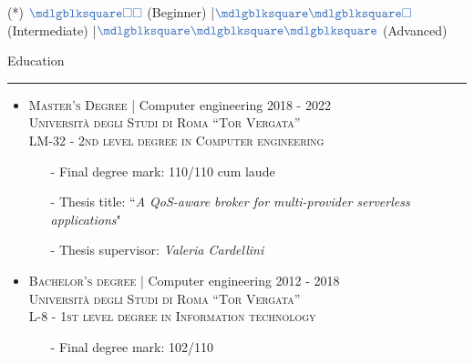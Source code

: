 \documentclass[english,10pt,a4paper]{article}
\newcommand{\CompanyName}[1]{\textsc{{\small #1}}}
\newcommand{\JobTimeRange}[1]{{\scriptsize \textcolor{CvColor!50}{\faCalendar*} \hspace{0.01cm} \textcolor{CvIcon}{#1}}}
\newcommand{\CvSection}[2]{
	\hspace{0.25cm}\textcolor{CvColor!50}{#1} \hspace{0.01cm} \textcolor{CvColor!80}{#2}\\
	\textcolor{CvColor}{\rule[.7\baselineskip]{\textwidth}{1pt}}}
\newcommand{\CvSidebarSection}[2]{
	\textcolor{CvColor!50}{{\footnotesize #1}} \hspace{0.01cm} \textcolor{CvColor!80}{{\footnotesize #2}} \\
	\textcolor{CvColor}{\rule[.7\baselineskip]{0.8\textwidth}{1pt}}}
\newcommand{\FullBlock}{\textcolor{CvColor}{\mdlgblksquare}}
\newcommand{\EmptyBlock}{\textcolor{CvColor}{\square}}
\newcommand{\Sep}{\textcolor{CvColor}{|}\hspace{0.1cm}}
\begin{document}
\begin{paracol}{2}
\begin{tcolorbox}[colback=CvSidebarBackColor,height=\textheight,boxrule=1pt, left=0pt,right=1pt,top=0pt,bottom=0pt, arc=0pt,outer arc=0pt, colframe=CvSidebarBackColor]
\begin{center}
{\begin{tabular}{lcc|c}
	\end{tabular}}


	{\tiny \textcolor{CvColor}{(*)} \hspace{0.05cm} $\FullBlock\EmptyBlock\EmptyBlock$ (Beginner) \Sep $\FullBlock\FullBlock\EmptyBlock$ (Intermediate) \Sep $\FullBlock\FullBlock\FullBlock$ (Advanced)}

\vspace{0.5cm}	


\end{center}
	

	
\end{tcolorbox}
\switchcolumn  %
\begin{tcolorbox}[colback=white, height=\textheight, colframe=white, left=0cm]
		
\vspace{0.3cm}	
\CvSection{\faGraduationCap}{Education}
\begin{itemize}
	\item \CompanyName{Master’s Degree} \textcolor{CvColor}{|} {\scriptsize Computer engineering} \hfill \JobTimeRange{2018 - 2022}\\
	{\scriptsize \textcolor{CvIcon}{\textsc{Università degli Studi di Roma ``Tor Vergata''}}} \\
	{\scriptsize \textcolor{CvIcon}{\textsc{LM-32 - 2nd level degree in Computer engineering}}}
	{\scriptsize \begin{itemize}
			\item[-] Final degree mark: \textcolor{CvColor}{110/110 cum laude}
			\item[-] Thesis title: ``\textit{A QoS-aware broker for multi-provider serverless applications}"
			\item[-] Thesis supervisor: \textit{Valeria Cardellini}	
	\end{itemize}}
	
	\item \CompanyName{Bachelor's degree} \textcolor{CvColor}{|} {\scriptsize Computer engineering} \hfill \JobTimeRange{2012 - 2018}\\
	{\scriptsize \textcolor{CvIcon}{\textsc{Università degli Studi di Roma ``Tor Vergata''}}} \\
	{\scriptsize \textcolor{CvIcon}{\textsc{L-8 - 1st level degree in Information technology}}}
	{\scriptsize \begin{itemize}
			\item[-] Final degree mark: \textcolor{CvColor}{102/110}	
	\end{itemize}}
		



\end{itemize}
\end{tcolorbox}
\end{paracol}
\end{document}
